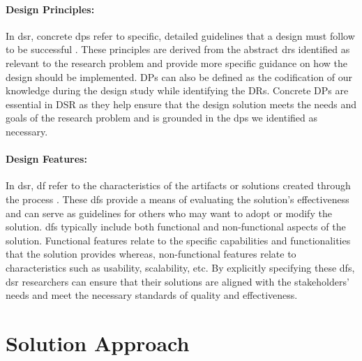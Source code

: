 \paragraph*{Design Principles:}
In \ac{dsr}, concrete \ac{dp}s refer to specific, detailed guidelines that a design must follow to be successful \cite{misc:dsr:webster}. 
These principles are derived from the abstract \ac{dr}s identified as relevant to the research problem and provide more specific guidance on how the design should be implemented.
DPs can also be defined as the codification of our knowledge during the design study while identifying the DRs. 
Concrete DPs are essential in DSR as they help ensure that the design solution meets the needs and goals of the research problem and is grounded in the \ac{dp}s we identified as necessary.

\paragraph{Design Features:}
In \ac{dsr}, \ac{df} refer to the characteristics of the artifacts or solutions created through the process \cite{misc:dsr:webster}. 
These \ac{df}s provide a means of evaluating the solution's effectiveness and can serve as guidelines for others who may want to adopt or modify the solution.
\ac{df}s typically include both functional and non-functional aspects of the solution. 
Functional features relate to the specific capabilities and functionalities that the solution provides whereas, non-functional features relate to characteristics such as usability, scalability, etc. 
By explicitly specifying these \ac{df}s, \ac{dsr} researchers can ensure that their solutions are aligned with the stakeholders' needs and meet the necessary standards of quality and effectiveness.

\clearpage
\section{Solution Approach}
\label{introduction:section:solution}

